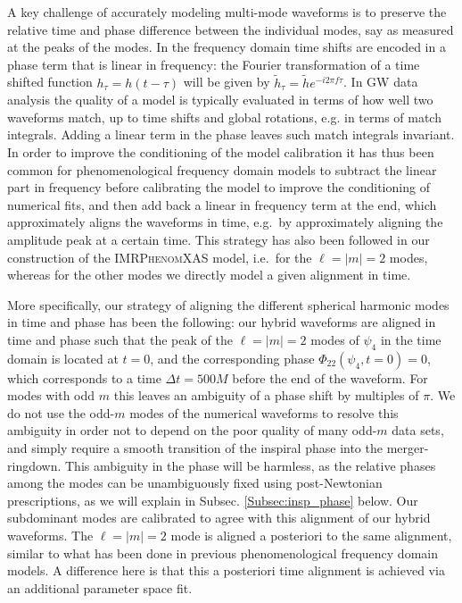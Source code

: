 \documentclass[twocolumn,prd,aps,superscriptaddress,preprintnumbers,tightenlines,showpacs,nofootinbib,eqsecnum,amsfonts,amsmath]{revtex4}
\newcommand{\phX}{\textsc{IMRPhenomXAS}\xspace}
\begin{document}
A key challenge of accurately modeling multi-mode waveforms is to preserve the relative  time and phase difference between the individual modes, say as measured at the peaks of the modes. In the frequency domain time shifts are encoded in a phase term that is linear in frequency:
the Fourier transformation of a time shifted function 
$h_\tau = h(t - \tau)$ will be given by 
$\tilde h_\tau = \tilde h e^{-i 2 \pi f \tau}$.
%
In GW data analysis the quality of a model is typically evaluated in terms of how well two waveforms match, up to time shifts and global rotations, e.g. in terms of match integrals.
Adding a linear term in the phase leaves such match integrals invariant.
In order to improve the conditioning of the model calibration it has thus been common for phenomenological frequency domain models to subtract the linear part in frequency before calibrating the model to improve the conditioning of numerical fits, and then add back a linear in frequency term at the end, which approximately aligns the waveforms in time, e.g.~by approximately aligning the amplitude peak at a certain time. This strategy has also been followed in our construction of the \phX model, i.e.~for the $\ell=\vert m\vert= 2$ modes,
whereas for the other modes we directly model a given alignment in time.

More specifically, our strategy of aligning the different spherical harmonic modes in time and phase has been the following: our hybrid waveforms are aligned in time and phase such that the peak of the $\ell=\vert m\vert= 2$ modes of $\psi_4$ in the time domain is located at $t=0$,
and the corresponding phase $\Phi_{22}(\psi_4, t=0) = 0 $, which corresponds to a time $\Delta t = 500 M$ before the end of the waveform. 
For modes with odd $m$ this leaves an ambiguity of a phase shift by multiples of $\pi$. %
We do not use the odd-$m$ modes of the numerical waveforms to resolve this ambiguity in order not to depend on the poor quality of many odd-$m$ data sets, and simply require a smooth transition of the inspiral phase into the merger-ringdown. This ambiguity in the phase will be harmless, as the relative phases among the modes can be unambiguously fixed using post-Newtonian prescriptions, as we will explain in Subsec. \ref{Subsec:insp_phase} below.
Our subdominant modes are calibrated to agree with this alignment of our hybrid waveforms.
The $\ell=\vert m\vert= 2$ mode is aligned a posteriori to the same alignment,
similar to what has been done in previous phenomenological frequency domain models. A difference here is that this a posteriori time alignment is achieved via an additional parameter space fit.
\end{document}
